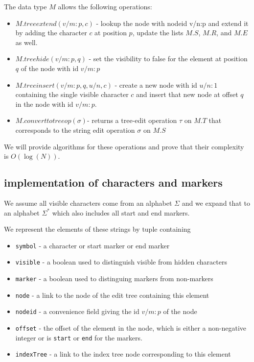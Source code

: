 \documentclass{amsart}
\begin{document}
The data type $M$ allows the following operations:
\begin{itemize}
\item $M.treeextend(v/m:p,c)$ - lookup the node with nodeid v/n:p and extend it by adding the character $c$ at position $p$, update the lists $M.S$, $M.R$, and $M.E$ as well.
\item $M.treehide(v/m:p,q)$ - set the visibility to false for the element at position $q$ of the node with id $v/m:p$
\item $M.treeinsert(v/m:p,q,u/n,c)$ - create a new node with id $u/n:1$ containing the single visible character $c$ and insert that new node at offset $q$ in the node with id $v/m:p$.
\item $M.converttotreeop(\sigma)$- returns a tree-edit operation $\tau$ on $M.T$ that corresponds to the string edit operation $\sigma$ on $M.S$
\end{itemize}
We will provide algorithms for these operations and prove that their complexity is $O(\log(N))$.
\subsection{implementation of characters and markers}
We assume all visible characters come from an alphabet $\Sigma$
and we expand that to an alphabet $\Sigma^*$ which also includes all start and end markers.


We represent the elements of these strings by tuple containing
\begin{itemize}
\item {\tt symbol} - a character or start marker or end marker 
\item {\tt visible} - a boolean used to distinguish visible from hidden characters
\item {\tt marker} - a boolean used to distinguing markers from non-markers
\item {\tt node} - a link to the node of the edit tree containing this element
\item {\tt nodeid} - a convenience field giving the id $v/m:p$ of the node
\item {\tt offset} - the offset of the element in the node, which is either a non-negative integer or is {\tt start} or {\tt end} for the markers.
\item {\tt indexTree} - a link to the index tree node corresponding to this element
\end{itemize}
\end{document}
